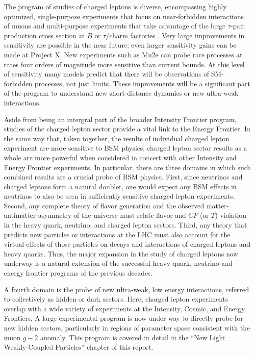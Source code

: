 The program of studies of charged leptons is diverse, encompassing highly optimized, single-purpose experiments that focus on near-forbidden interactions of muons and multi-purpose experiments that take advantage of the large $\tau$-pair production cross section at $B$ or $\tau$/charm factories .
Very large
improvements in sensitivity are possible in the near future; even larger sensitivity gains can be made at Project X.  New
experiments such as Mu2e can probe rare processes at rates four orders
of magnitude more sensitive than current bounds. At this level of sensitivity many models predict that there will be observations of SM-forbidden processes, not just limits. These 
improvements will be a significant part of the program to understand new short-distance dynamics or new ultra-weak interactions.

Aside from being an intergral part of the broader Intensity Frontier program, studies of the  charged lepton sector provide  a vital link to the Energy Frontier. In the same way that, taken together, the results of individual charged
lepton experiment are more sensitive to BSM physics, charged lepton sector results as a whole are more
powerful when considered in concert with other Intensity and Energy Frontier experiments.  In
particular, there are three domains in which such combined results are a
crucial probe of BSM physics.   First, since neutrinos and charged leptons form a 
natural doublet, one would expect any BSM effects
 in neutrinos to also be seen in sufficiently sensitive charged lepton experiments.  
 Second, any complete theory of 
 flavor generation and the observed matter-antimatter asymmetry of the universe must 
 relate flavor and $C\!P$ (or $T$) violation in the heavy quark, neutrino, and charged lepton sectors.  
 Third,  any theory that predicts new particles or interactions at the LHC must also account for the virtual effects of those particles on decays and interactions of charged leptons and heavy quarks.
Thus, the major expansion in the study of charged leptons now underway is a natural extension of the successful heavy quark, neutrino and energy frontier programs of the previous decades.

A fourth domain is the probe of new ultra-weak, low energy interactions, referred to collectively  as hidden or dark sectors.  Here, charged lepton experiments overlap  with a wide variety of
experiments at the Intensity, Cosmic, and Energy Frontiers.  A large
experimental program is now under way to directly probe for new
hidden sectors, particularly in regions of parameter space
consistent with the muon $g-2$ anomaly.  This program is covered
in detail in the ``New Light Weakly-Coupled Particles'' chapter of this report.

